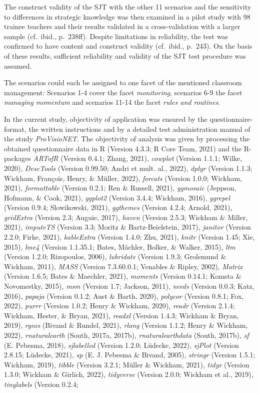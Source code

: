 \documentclass[
  man]{apa6}
\begin{document}
The construct validity of the SJT with the other 11 scenarios and the sensitivity to differences in strategic knowledge was then examined in a pilot study with 98 trainee teachers and their results validated in a cross-validation with a larger sample (cf.~ibid., p.~238ff). Despite limitations in reliability, the test was confirmed to have content and construct validity (cf.~ibid., p.~243). On the basis of these results, sufficient reliability and validity of the SJT test procedure was assumed.

The scenarios could each be assigned to one facet of the mentioned classroom management: Scenarios 1-4 cover the facet \emph{monitoring}, scenarios 6-9 the facet \emph{managing momentum} and scenarios 11-14 the facet \emph{rules and routines}.

In the current study, objectivity of application was ensured by the questionnaire-format, the written instructions and by a detailed test administration manual of the study \emph{ProVisioNET}. The objectivity of analysis was given by processing the obtained questionnaire data in R (Version 4.3.3; R Core Team, 2021) and the R-packages \emph{ARTofR} (Version 0.4.1; Zhang, 2021), \emph{cowplot} (Version 1.1.1; Wilke, 2020), \emph{DescTools} (Version 0.99.50; Andri et mult. al., 2022), \emph{dplyr} (Version 1.1.3; Wickham, François, Henry, \& Müller, 2022), \emph{forcats} (Version 1.0.0; Wickham, 2021), \emph{formattable} (Version 0.2.1; Ren \& Russell, 2021), \emph{ggmosaic} (Jeppson, Hofmann, \& Cook, 2021), \emph{ggplot2} (Version 3.4.4; Wickham, 2016), \emph{ggrepel} (Version 0.9.4; Slowikowski, 2021), \emph{ggthemes} (Version 4.2.4; Arnold, 2021), \emph{gridExtra} (Version 2.3; Auguie, 2017), \emph{haven} (Version 2.5.3; Wickham \& Miller, 2021), \emph{imputeTS} (Version 3.3; Moritz \& Bartz-Beielstein, 2017), \emph{janitor} (Version 2.2.0; Firke, 2021), \emph{kableExtra} (Version 1.4.0; Zhu, 2021), \emph{knitr} (Version 1.45; Xie, 2015), \emph{lme4} (Version 1.1.35.1; Bates, Mächler, Bolker, \& Walker, 2015), \emph{ltm} (Version 1.2.0; Rizopoulos, 2006), \emph{lubridate} (Version 1.9.3; Grolemund \& Wickham, 2011), \emph{MASS} (Version 7.3.60.0.1; Venables \& Ripley, 2002), \emph{Matrix} (Version 1.6.5; Bates \& Maechler, 2021), \emph{moments} (Version 0.14.1; Komsta \& Novomestky, 2015), \emph{msm} (Version 1.7; Jackson, 2011), \emph{needs} (Version 0.0.3; Katz, 2016), \emph{papaja} (Version 0.1.2; Aust \& Barth, 2020), \emph{polycor} (Version 0.8.1; Fox, 2022), \emph{purrr} (Version 1.0.2; Henry \& Wickham, 2020), \emph{readr} (Version 2.1.4; Wickham, Hester, \& Bryan, 2021), \emph{readxl} (Version 1.4.3; Wickham \& Bryan, 2019), \emph{rgeos} (Bivand \& Rundel, 2021), \emph{rlang} (Version 1.1.2; Henry \& Wickham, 2022), \emph{rnaturalearth} (South, 2017a, 2017b), \emph{rnaturalearthdata} (South, 2017b), \emph{sf} (E. Pebesma, 2018), \emph{sjlabelled} (Version 1.2.0; Lüdecke, 2022), \emph{sjPlot} (Version 2.8.15; Lüdecke, 2021), \emph{sp} (E. J. Pebesma \& Bivand, 2005), \emph{stringr} (Version 1.5.1; Wickham, 2019), \emph{tibble} (Version 3.2.1; Müller \& Wickham, 2021), \emph{tidyr} (Version 1.3.0; Wickham \& Girlich, 2022), \emph{tidyverse} (Version 2.0.0; Wickham et al., 2019), \emph{tinylabels} (Version 0.2.4; 
\end{document}
